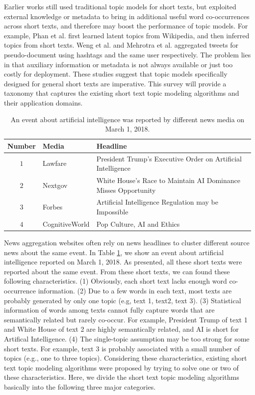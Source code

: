 \documentclass[10pt,journal,compsoc]{IEEEtran}
\begin{document}
Earlier works \cite{jin2011transferring,phan2008learning} still used traditional topic models for short texts, but exploited external knowledge or metadata to bring in additional useful word co-occurrences across short texts, and therefore may boost the performance of topic models. For example, Phan et al. \cite{phan2008learning} first learned latent topics from Wikipedia, and then inferred topics from short texts. Weng et al. \cite{weng2010twitterrank} and Mehrotra et al. \cite{mehrotra2013improving} aggregated tweets for pseudo-document using hashtags and the same user respectively. The problem lies in that auxiliary information or metadata is not always available or just too costly for deployment. These studies suggest that topic models specifically designed for general short texts are imperative. This survey will provide a taxonomy that captures the existing short text topic modeling algorithms and their application domains.

\begin{table}
  \centering
  \caption{An event about artificial intelligence was reported by different news media on March 1, 2018.} \label{example}
  \begin{tabular}{|c|l|l|} \hline
  \textbf{Number} & \textbf{Media} & \textbf{Headline} \\ \hline
  $1$ & Lawfare & President Trump's Executive Order on Artificial Intelligence\\\hline
  $2$ &Nextgov & White House’s Race to Maintain AI Dominance Misses Opportunity\\\hline
  $3$& Forbes & Artificial Intelligence Regulation may be Impossible \\\hline
  $4$&  CognitiveWorld &Pop Culture, AI and Ethics \\
  \hline
  
  \end{tabular}
\end{table}

News aggregation websites often rely on news headlines to cluster different source news about the same event. In Table \ref{example}, we show an event about artificial intelligence reported on March 1, 2018. As presented, all these short texts were reported about the same event. From these short texts, we can found these following characteristics. (1) Obviously, each short text lacks enough word co-occurrence information. (2) Due to a few words in each text, most texts are probably generated by only one topic (e.g, text 1, text2, text 3). (3) Statistical information of words among texts cannot fully capture words that are semantically related but rarely co-occur. For example, President Trump of text 1 and White House of text 2 are highly semantically related, and AI is short for Artifical Intelligence. (4) The single-topic assumption may be too strong for some short texts. For example, text 3 is probably associated with a small number of topics (e.g., one to three topics). Considering these characteristics, existing short text topic modeling algorithms were proposed by trying to solve one or two of these characteristics. Here, we divide the short text topic modeling algorithms basically into the following three major categories.
\end{document}
